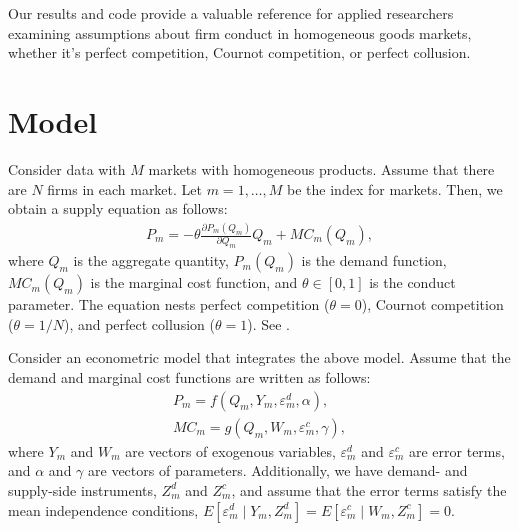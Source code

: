 \documentclass[11pt, a4paper]{article}
\begin{document}
Our results and code provide a valuable reference for applied researchers examining assumptions about firm conduct in homogeneous goods markets, whether it's perfect competition, Cournot competition, or perfect collusion.

\section{Model}
Consider data with $M$ markets with homogeneous products.
Assume that there are $N$ firms in each market.
Let $m = 1,\ldots, M$ be the index for markets.
Then, we obtain a supply equation as follows:
\begin{align}
     P_m = -\theta\frac{\partial P_m(Q_{m})}{\partial Q_{m}}Q_{m} + MC_m(Q_{m}),\label{eq:supply_equation}
\end{align}
where $Q_{m}$ is the aggregate quantity, $P_m(Q_{m})$ is the demand function, $MC_{m}(Q_{m})$ is the marginal cost function, and $\theta\in[0,1]$ is  the conduct parameter. 
The equation nests perfect competition ($\theta=0$), Cournot competition ($\theta=1/N$), and perfect collusion ($\theta=1$). See \cite{bresnahan1982oligopoly}. 

Consider an econometric model that integrates the above model.
Assume that the demand and marginal cost functions are written as follows: 
\begin{align}
    P_m = f(Q_{m}, Y_m, \varepsilon^{d}_{m}, \alpha), \label{eq:demand}\\
    MC_m = g(Q_{m}, W_{m}, \varepsilon^{c}_{m}, \gamma),\label{eq:marginal_cost}
\end{align}
where $Y_m$ and $W_{m}$ are vectors of exogenous variables, $\varepsilon^{d}_{m}$ and $\varepsilon^{c}_{m}$ are error terms, and $\alpha$ and $\gamma$ are vectors of parameters.
Additionally, we have demand- and supply-side instruments, $Z^{d}_{m}$ and $Z^{c}_{m}$, and assume that the error terms satisfy the mean independence conditions, $E[\varepsilon^{d}_{m}\mid Y_m, Z^{d}_{m}] = E[\varepsilon^{c}_{m} \mid W_{m}, Z^{c}_{m}] =0$.
\end{document}
